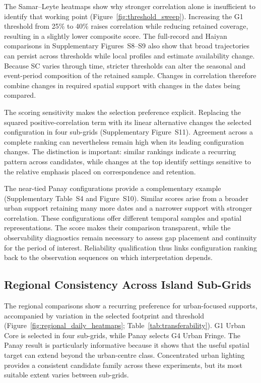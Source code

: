 \documentclass[]{interact}
\theoremstyle{plain}%
\theoremstyle{definition}
\theoremstyle{remark}
\begin{document}
        The Samar--Leyte heatmaps show why stronger correlation alone is insufficient to identify that working point (Figure~\ref{fig:threshold_sweep}). Increasing the G1 threshold from 25\% to 40\% raises correlation while reducing retained coverage, resulting in a slightly lower composite score. The full-record and Haiyan comparisons in Supplementary Figures~S8--S9 also show that broad trajectories can persist across thresholds while local profiles and estimate availability change. Because SC varies through time, stricter thresholds can alter the seasonal and event-period composition of the retained sample. Changes in correlation therefore combine changes in required spatial support with changes in the dates being compared.
        
        The scoring sensitivity makes the selection preference explicit. Replacing the squared positive-correlation term with its linear alternative changes the selected configuration in four sub-grids (Supplementary Figure~S11). Agreement across a complete ranking can nevertheless remain high when its leading configuration changes. The distinction is important: similar rankings indicate a recurring pattern across candidates, while changes at the top identify settings sensitive to the relative emphasis placed on correspondence and retention.
        
        The near-tied Panay configurations provide a complementary example (Supplementary Table~S4 and Figure~S10). Similar scores arise from a broader urban support retaining many more dates and a narrower support with stronger correlation. These configurations offer different temporal samples and spatial representations. The score makes their comparison transparent, while the observability diagnostics remain necessary to assess gap placement and continuity for the period of interest. Reliability qualification thus links configuration ranking back to the observation sequences on which interpretation depends.
        
    \subsection{Regional Consistency Across Island Sub-Grids}
    
        The regional comparisons show a recurring preference for urban-focused supports, accompanied by variation in the selected footprint and threshold (Figure~\ref{fig:regional_daily_heatmaps}; Table~\ref{tab:transferability}). G1 Urban Core is selected in four sub-grids, while Panay selects G4 Urban Fringe. The Panay result is particularly informative because it shows that the useful spatial target can extend beyond the urban-centre class. Concentrated urban lighting provides a consistent candidate family across these experiments, but its most suitable extent varies between sub-grids.
        
\end{document}
